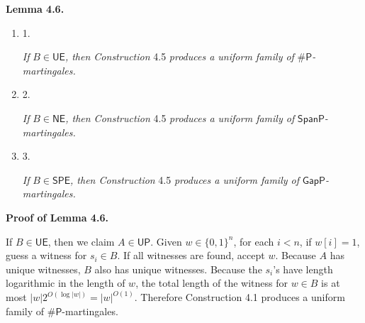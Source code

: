 \documentclass[10pt,a4paper]{article}
\begin{document}
\par\medskip\noindent\textbf{
\textbf{Lemma 4.6}\textbf{.}
}\par



\begin{enumerate}


\item[] 
1. 


\emph{If }$B\in\mathsf{UE}$\emph{, then Construction }4.5\emph{ produces a uniform family of }${\mathsf{\#}\mathsf{P}}$\emph{-martingales.}\par





\item[] 
2. 


\emph{If }$B\in\mathsf{NE}$\emph{, then Construction }4.5\emph{ produces a uniform family of }$\mathsf{SpanP}$\emph{-martingales.}\par





\item[] 
3. 


\emph{If }$B\in\mathsf{SPE}$\emph{, then Construction }4.5\emph{ produces a uniform family of }$\mathsf{GapP}$\emph{-martingales.}\par





\end{enumerate}






\par\medskip\noindent\textbf{Proof of Lemma 4.6.}\par




If $B\in\mathsf{UE}$, then we claim $A\in\mathsf{UP}$. Given $w\in\{0,1\}^{n}$, for each $i<n$, if $w[i]=1$, guess a witness for $s_{i}\in B$. If all witnesses are found, accept $w$. Because $A$ has unique witnesses, $B$ also has unique witnesses. Because the $s_{i}$’s have length logarithmic in the length of $w$, the total length of the witness for $w\in B$ is at most $|w|2^{O(\log|w|)}=|w|^{O(1)}$.
Therefore Construction 4.1 produces a uniform family of ${\mathsf{\#}\mathsf{P}}$-martingales.\par
\end{document}
